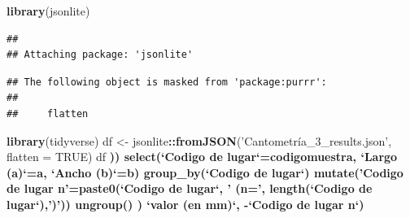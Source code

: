\documentclass[11pt,]{article}
\newenvironment{Shaded}{\begin{snugshade}}{\end{snugshade}}
\newcommand{\KeywordTok}[1]{\textcolor[rgb]{0.13,0.29,0.53}{\textbf{#1}}}
\newcommand{\DataTypeTok}[1]{\textcolor[rgb]{0.13,0.29,0.53}{#1}}
\newcommand{\StringTok}[1]{\textcolor[rgb]{0.31,0.60,0.02}{#1}}
\newcommand{\OtherTok}[1]{\textcolor[rgb]{0.56,0.35,0.01}{#1}}
\newcommand{\OperatorTok}[1]{\textcolor[rgb]{0.81,0.36,0.00}{\textbf{#1}}}
\newcommand{\NormalTok}[1]{#1}
\begin{document}
\begin{Shaded}
\begin{Highlighting}[]
\KeywordTok{library}\NormalTok{(jsonlite)}
\end{Highlighting}
\end{Shaded}

\begin{verbatim}
## 
## Attaching package: 'jsonlite'
\end{verbatim}

\begin{verbatim}
## The following object is masked from 'package:purrr':
## 
##     flatten
\end{verbatim}

\begin{Shaded}
\begin{Highlighting}[]
\KeywordTok{library}\NormalTok{(tidyverse)}
\NormalTok{df <-}\StringTok{ }\NormalTok{jsonlite}\OperatorTok{::}\KeywordTok{fromJSON}\NormalTok{(}\StringTok{'Cantometría_3_results.json'}\NormalTok{, }\DataTypeTok{flatten =} \OtherTok{TRUE}\NormalTok{)}
\NormalTok{df  }\OperatorTok{%
\NormalTok{                               )) }\OperatorTok{%
\StringTok{  }\KeywordTok{select}\NormalTok{(}\StringTok{`}\DataTypeTok{Codigo de lugar}\StringTok{`}\NormalTok{=codigomuestra, }\StringTok{`}\DataTypeTok{Largo (a)}\StringTok{`}\NormalTok{=a,}
         \StringTok{`}\DataTypeTok{Ancho (b)}\StringTok{`}\NormalTok{=b) }\OperatorTok{%
\StringTok{  }\KeywordTok{group_by}\NormalTok{(}\StringTok{`}\DataTypeTok{Codigo de lugar}\StringTok{`}\NormalTok{) }\OperatorTok{%
\StringTok{  }\KeywordTok{mutate}\NormalTok{(}\StringTok{'Codigo de lugar n'}\NormalTok{=}\KeywordTok{paste0}\NormalTok{(}\StringTok{`}\DataTypeTok{Codigo de lugar}\StringTok{`}\NormalTok{,}
                           \StringTok{' (n='}\NormalTok{, }\KeywordTok{length}\NormalTok{(}\StringTok{`}\DataTypeTok{Codigo de lugar}\StringTok{`}\NormalTok{),}\StringTok{')'}\NormalTok{)) }\OperatorTok{%
\StringTok{  }\KeywordTok{ungroup}\NormalTok{() }\OperatorTok{%
\NormalTok{                       ) }\OperatorTok{%
                    \StringTok{`}\DataTypeTok{valor (en mm)}\StringTok{`}\NormalTok{, }\OperatorTok{-}\StringTok{`}\DataTypeTok{Codigo de lugar n}\StringTok{`}\NormalTok{) }\OperatorTok{%
}}}}}}}}
\end{Highlighting}
\end{Shaded}
\end{document}

